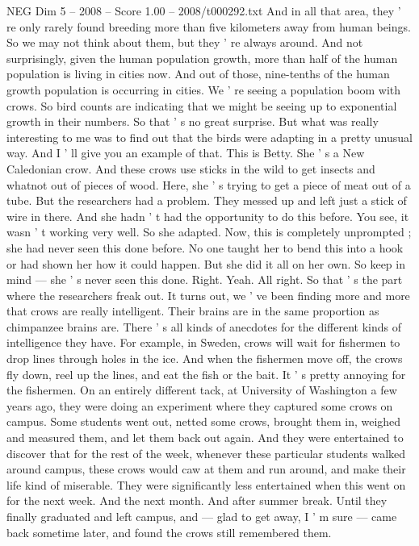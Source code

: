 \begin{textsample}{NEG Dim 5 – 2008 – Score 1.00 – 2008/t000292.txt}
And in all that area, they ' re only rarely found breeding more than five kilometers away from human beings.
So we may not think about them, but they ' re always around.
And not surprisingly, given the human population growth, more than half of the human population is living in cities now.
And out of those, nine-tenths of the human growth population is occurring in cities.
We ' re seeing a population boom with crows.
So bird counts are indicating that we might be seeing up to exponential growth in their numbers.
So that ' s no great surprise.
But what was really interesting to me was to find out that the birds were adapting in a pretty unusual way.
And I ' ll give you an example of that.
This is Betty.
She ' s a New Caledonian crow.
And these crows use sticks in the wild to get insects and whatnot out of pieces of wood.
Here, she ' s trying to get a piece of meat out of a tube.
But the researchers had a problem.
They messed up and left just a stick of wire in there.
And she hadn ' t had the opportunity to do this before.
You see, it wasn ' t working very well.
So she adapted.
Now, this is completely unprompted ; she had never seen this done before.
No one taught her to bend this into a hook or had shown her how it could happen.
But she did it all on her own.
So keep in mind — she ' s never seen this done.
Right.
Yeah.
All right.
So that ' s the part where the researchers freak out.
It turns out, we ' ve been finding more and more that crows are really intelligent.
Their brains are in the same proportion as chimpanzee brains are.
There ' s all kinds of anecdotes for the different kinds of intelligence they have.
For example, in Sweden, crows will wait for fishermen to drop lines through holes in the ice.
And when the fishermen move off, the crows fly down, reel up the lines, and eat the fish or the bait.
It ' s pretty annoying for the fishermen.
On an entirely different tack, at University of Washington a few years ago, they were doing an experiment where they captured some crows on campus.
Some students went out, netted some crows, brought them in, weighed and measured them, and let them back out again.
And they were entertained to discover that for the rest of the week, whenever these particular students walked around campus, these crows would caw at them and run around, and make their life kind of miserable.
They were significantly less entertained when this went on for the next week.
And the next month.
And after summer break.
Until they finally graduated and left campus, and — glad to get away, I ' m sure — came back sometime later, and found the crows still remembered them.

\end{textsample}
